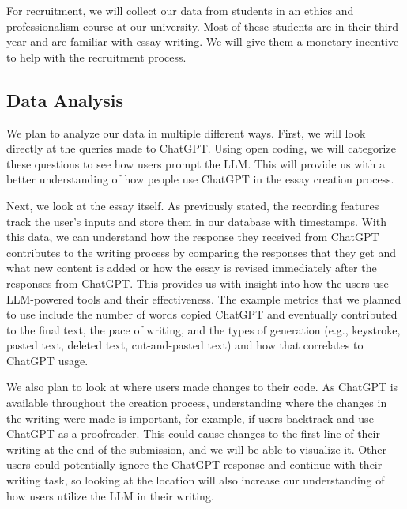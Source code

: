 \documentclass[sigconf]{acmart}
\begin{document}
    For recruitment, we will collect our data from students in an ethics and professionalism course at our university. Most of these students are in their third year and are familiar with essay writing. We will give them a monetary incentive to help with the recruitment process.

\subsection{Data Analysis}

    We plan to analyze our data in multiple different ways. First, we will look directly at the queries made to ChatGPT. Using open coding, we will categorize these questions to see how users prompt the LLM. This will provide us with a better understanding of how people use ChatGPT in the essay creation process.

    Next, we look at the essay itself. As previously stated, the recording features track the user's inputs and store them in our database with timestamps. With this data, we can understand how the response they received from ChatGPT contributes to the writing process by comparing the responses that they get and what new content is added or how the essay is revised immediately after the responses from ChatGPT. This provides us with insight into how the users use LLM-powered tools and their effectiveness. The example metrics that we planned to use include the number of words copied ChatGPT and eventually contributed to the final text, the pace of writing, and the types of generation (e.g., keystroke, pasted text, deleted text, cut-and-pasted text) and how that correlates to ChatGPT usage. 
    
    We also plan to look at where users made changes to their code. As ChatGPT is available throughout the creation process, understanding where the changes in the writing were made is important, for example, if users backtrack and use ChatGPT as a proofreader. This could cause changes to the first line of their writing at the end of the submission, and we will be able to visualize it. Other users could potentially ignore the ChatGPT response and continue with their writing task, so looking at the location will also increase our understanding of how users utilize the LLM in their writing. 
    
\end{document}
